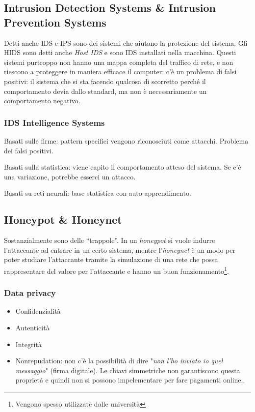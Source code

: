 \subsection{Intrusion Detection Systems \& Intrusion Prevention Systems}

Detti anche IDS e IPS sono dei sistemi che aiutano la protezione del sistema. 
Gli HIDS sono detti anche \textit{Host IDS} e sono IDS installati nella 
macchina. Questi sistemi purtroppo non hanno una mappa completa del traffico di 
rete, e non riescono a proteggere in maniera efficace il computer: c'è un 
problema di falsi positivi: il sistema che si sta facendo qualcosa di scorretto 
perché il comportamento devia dallo standard, ma non è necessariamente un 
comportamento negativo.

\subsubsection{IDS Intelligence Systems}

Basati sulle firme: pattern specifici vengono riconosciuti come attacchi. 
Problema dei falsi positivi.

Basati sulla statistica: viene capito il comportamento atteso del sistema. Se 
c'è una variazione, potrebbe esserci un attacco.

Basati su reti neurali: base statistica con auto-apprendimento.

\subsection{Honeypot \& Honeynet}

Sostanzialmente sono delle ``trappole''. In un \textit{honeypot} si vuole 
indurre l'attaccante ad entrare in un certo sistema, mentre l'\textit{honeynet} 
è un modo per poter studiare l'attaccante tramite la simulazione di una rete che 
possa rappresentare del valore per l'attaccante e hanno un buon 
funzionamento\footnote{Vengono spesso utilizzate dalle università}.

\subsubsection{Data privacy}

\begin{itemize}
\item Confidenzialità
\item Autenticità
\item Integrità
\item Nonrepudation: non c'è la possibilità di dire "\textit{non l'ho inviato io 
quel messaggio}" (firma digitale). Le chiavi simmetriche non garantiscono questa 
proprietà e quindi non si possono impelementare per fare pagamenti online..
\end{itemize}

